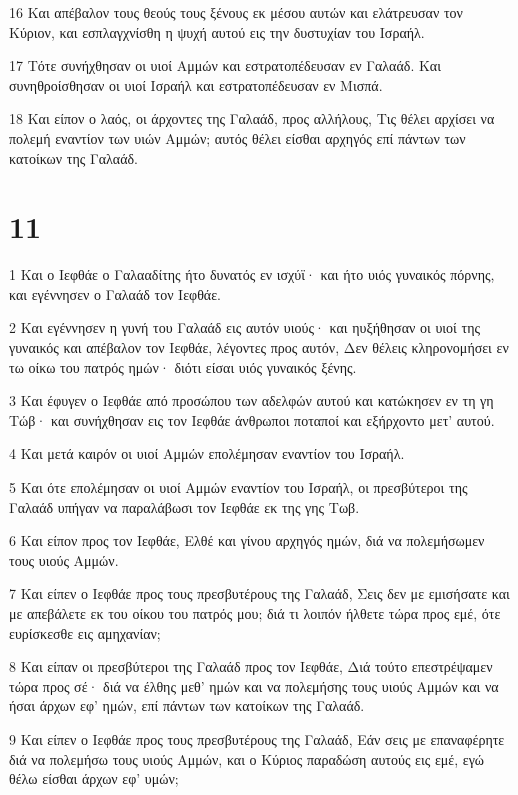 \par 16 Και απέβαλον τους θεούς τους ξένους εκ μέσου αυτών και ελάτρευσαν τον Κύριον, και εσπλαγχνίσθη η ψυχή αυτού εις την δυστυχίαν του Ισραήλ.
\par 17 Τότε συνήχθησαν οι υιοί Αμμών και εστρατοπέδευσαν εν Γαλαάδ. Και συνηθροίσθησαν οι υιοί Ισραήλ και εστρατοπέδευσαν εν Μισπά.
\par 18 Και είπον ο λαός, οι άρχοντες της Γαλαάδ, προς αλλήλους, Τις θέλει αρχίσει να πολεμή εναντίον των υιών Αμμών; αυτός θέλει είσθαι αρχηγός επί πάντων των κατοίκων της Γαλαάδ.

\chapter{11}

\par 1 Και ο Ιεφθάε ο Γαλααδίτης ήτο δυνατός εν ισχύϊ· και ήτο υιός γυναικός πόρνης, και εγέννησεν ο Γαλαάδ τον Ιεφθάε.
\par 2 Και εγέννησεν η γυνή του Γαλαάδ εις αυτόν υιούς· και ηυξήθησαν οι υιοί της γυναικός και απέβαλον τον Ιεφθάε, λέγοντες προς αυτόν, Δεν θέλεις κληρονομήσει εν τω οίκω του πατρός ημών· διότι είσαι υιός γυναικός ξένης.
\par 3 Και έφυγεν ο Ιεφθάε από προσώπου των αδελφών αυτού και κατώκησεν εν τη γη Τώβ· και συνήχθησαν εις τον Ιεφθάε άνθρωποι ποταποί και εξήρχοντο μετ' αυτού.
\par 4 Και μετά καιρόν οι υιοί Αμμών επολέμησαν εναντίον του Ισραήλ.
\par 5 Και ότε επολέμησαν οι υιοί Αμμών εναντίον του Ισραήλ, οι πρεσβύτεροι της Γαλαάδ υπήγαν να παραλάβωσι τον Ιεφθάε εκ της γης Τωβ.
\par 6 Και είπον προς τον Ιεφθάε, Ελθέ και γίνου αρχηγός ημών, διά να πολεμήσωμεν τους υιούς Αμμών.
\par 7 Και είπεν ο Ιεφθάε προς τους πρεσβυτέρους της Γαλαάδ, Σεις δεν με εμισήσατε και με απεβάλετε εκ του οίκου του πατρός μου; διά τι λοιπόν ήλθετε τώρα προς εμέ, ότε ευρίσκεσθε εις αμηχανίαν;
\par 8 Και είπαν οι πρεσβύτεροι της Γαλαάδ προς τον Ιεφθάε, Διά τούτο επεστρέψαμεν τώρα προς σέ· διά να έλθης μεθ' ημών και να πολεμήσης τους υιούς Αμμών και να ήσαι άρχων εφ' ημών, επί πάντων των κατοίκων της Γαλαάδ.
\par 9 Και είπεν ο Ιεφθάε προς τους πρεσβυτέρους της Γαλαάδ, Εάν σεις με επαναφέρητε διά να πολεμήσω τους υιούς Αμμών, και ο Κύριος παραδώση αυτούς εις εμέ, εγώ θέλω είσθαι άρχων εφ' υμών;
